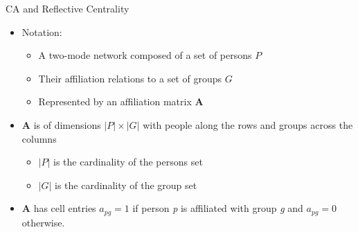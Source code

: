 \documentclass[
  ignorenonframetext,
]{beamer}
\providecommand{\tightlist}{%
  \setlength{\itemsep}{0pt}\setlength{\parskip}{0pt}}\usepackage{longtable,booktabs,array}
\begin{document}
\begin{frame}{CA and Reflective Centrality}
\protect\hypertarget{ca-and-reflective-centrality-1}{}
\begin{itemize}
\tightlist
\item
  Notation:

  \begin{itemize}
  \tightlist
  \item
    A two-mode network composed of a set of persons \(P\)
  \item
    Their affiliation relations to a set of groups \(G\)
  \item
    Represented by an affiliation matrix \(\mathbf{A}\)
  \end{itemize}
\end{itemize}

\pause

\begin{itemize}
\tightlist
\item
  \(\mathbf{A}\) is of dimensions \(|P| \times |G|\) with people along
  the rows and groups across the columns

  \begin{itemize}
  \tightlist
  \item
    \(|P|\) is the cardinality of the persons set\\
  \item
    \(|G|\) is the cardinality of the group set
  \end{itemize}
\end{itemize}

\pause

\begin{itemize}
\tightlist
\item
  \(\mathbf{A}\) has cell entries \(a_{pg}= 1\) if person \textit{p} is
  affiliated with group \textit{g} and \(a_{pg}= 0\) otherwise.
\end{itemize}
\end{frame}
\end{document}

